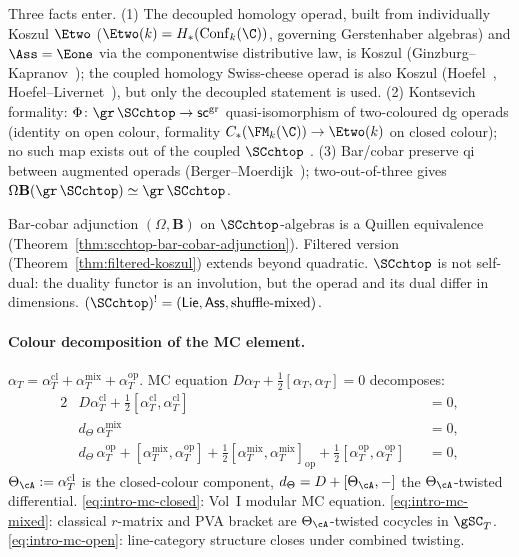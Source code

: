 Three facts enter. (1) The decoupled homology operad, built
from individually Koszul $\Etwo$ ($\Etwo(k) = H_\ast(\mathrm{Conf}_k(\C))$,
governing Gerstenhaber algebras) and $\Ass = \Eone$ via the
componentwise distributive law, is Koszul (Ginzburg--Kapranov~\cite{GK94});
the coupled homology Swiss-cheese operad is also Koszul
(Hoefel~\cite{Hoe09}, Hoefel--Livernet~\cite{HL12}), but only the
decoupled statement is used. (2)
Kontsevich formality: $\Phi\colon \gr\,\SCchtop \to \mathsf{sc}^{\mathrm{gr}}$
quasi-isomorphism of two-coloured dg operads (identity on open
colour, formality $C_\ast(\FM_k(\C)) \to \Etwo(k)$ on closed
colour); no such map exists out of the coupled $\SCchtop$
\cite{Liv15}. (3) Bar/cobar preserve qi between augmented operads
(Berger--Moerdijk~\cite{BM03}); two-out-of-three gives
$\Omega \mathbf{B}(\gr\,\SCchtop) \simeq \gr\,\SCchtop$.

Bar-cobar adjunction $(\Omega, \mathbf{B})$ on $\SCchtop$-algebras
is a Quillen equivalence
(Theorem~\ref{thm:scchtop-bar-cobar-adjunction}). Filtered version
(Theorem~\ref{thm:filtered-koszul}) extends beyond quadratic.
$\SCchtop$ is not self-dual: the duality functor is an
involution, but the operad and its dual differ in dimensions.
$(\SCchtop)^! = (\mathsf{Lie}, \mathsf{Ass},
\text{shuffle-mixed})$.

\paragraph{Colour decomposition of the MC element.}
$\alpha_T = \alpha_T^{\mathrm{cl}} + \alpha_T^{\mathrm{mix}} +
\alpha_T^{\mathrm{op}}$. MC equation
$D\alpha_T + \tfrac{1}{2}[\alpha_T, \alpha_T] = 0$ decomposes:
\begin{alignat}{2}
\label{eq:intro-mc-closed}
&D\alpha_T^{\mathrm{cl}}
 + \tfrac{1}{2}[\alpha_T^{\mathrm{cl}},
 \alpha_T^{\mathrm{cl}}] &&= 0, \\
\label{eq:intro-mc-mixed}
&d_{\Theta}\,\alpha_T^{\mathrm{mix}} &&= 0, \\
\label{eq:intro-mc-open}
&d_{\Theta}\,\alpha_T^{\mathrm{op}}
 + [\alpha_T^{\mathrm{mix}}, \alpha_T^{\mathrm{op}}]
 + \tfrac{1}{2}[\alpha_T^{\mathrm{mix}},
 \alpha_T^{\mathrm{mix}}]_{\mathrm{op}}
 + \tfrac{1}{2}[\alpha_T^{\mathrm{op}},
 \alpha_T^{\mathrm{op}}] &&= 0,
\end{alignat}
$\Theta_\cA := \alpha_T^{\mathrm{cl}}$ is the closed-colour
component, $d_\Theta = D + [\Theta_\cA, -]$ the
$\Theta_\cA$-twisted differential.
\eqref{eq:intro-mc-closed}: Vol~I modular MC equation.
\eqref{eq:intro-mc-mixed}: classical $r$-matrix and PVA bracket
are $\Theta_\cA$-twisted cocycles in $\gSC_T$.
\eqref{eq:intro-mc-open}: line-category structure closes under
combined twisting.

